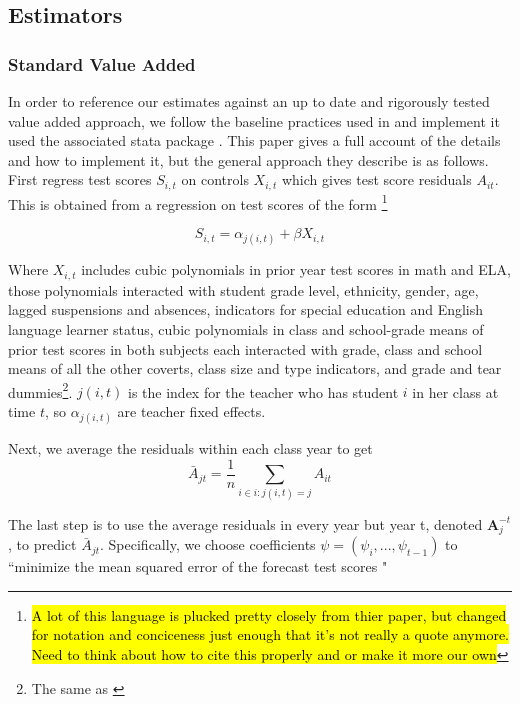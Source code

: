 \documentclass[12pt]{article}
\theoremstyle{definition}
\theoremstyle{definition}
\theoremstyle{definition}
\theoremstyle{definition}
\begin{document}
    \subsection{Estimators}
    \subsubsection{Standard Value Added}

    In order to reference our estimates against an up to date and rigorously tested value added approach, we follow the baseline practices used in \citet{chetty2014measuring1} and implement it used the associated stata package \citep{vam_stata_ado}. This paper gives a full account of the details and how to implement it, but the general approach they describe is as follows. First regress test scores $S_{i,t}$ on controls $X_{i, t}$ which gives test score residuals $A_{it}$. This is obtained from a regression on test scores of the form \footnote{\hl{A lot of this language is plucked pretty closely from thier paper, but changed for notation and conciceness just enough that it's not really a quote anymore. Need to think about how to cite this properly and or make it more our own}}

    \begin{equation}
        S_{i,t} = \alpha_{j(i, t)} + \beta X_{i, t}
    \end{equation}

    Where $X_{i, t}$ includes cubic polynomials in prior year test scores in math and ELA, those polynomials interacted with student grade level, ethnicity, gender, age, lagged suspensions and absences, indicators for special education and English language learner status, cubic polynomials in class and school-grade means of prior test scores in both subjects each interacted with grade, class and school means of all the other coverts, class size and type indicators, and grade and tear dummies\footnote{The same as \citep{chetty2014measuring1}}. $j(i, t)$ is the index for the teacher who has student $i$ in her class at time $t$, so $\alpha_{j(i, t)}$ are teacher fixed effects.

    Next, we average the residuals within each class year to get 
    \begin{equation}
        \bar{A}_{jt} = \frac{1}{n} \sum_{i \in {i: j(i, t) = j}} A_{it}
    \end{equation}

    The last step is to use the average residuals in every year but year t, denoted $\mathbf{A}_j^{-t}$, to predict $\bar{A}_{jt} $. Specifically, we choose coefficients $\psi = (\psi_i, ..., \psi_{t-1})$ to ``minimize the mean squared error of the forecast test scores \citep{chetty2014measuring1}"
\end{document}
